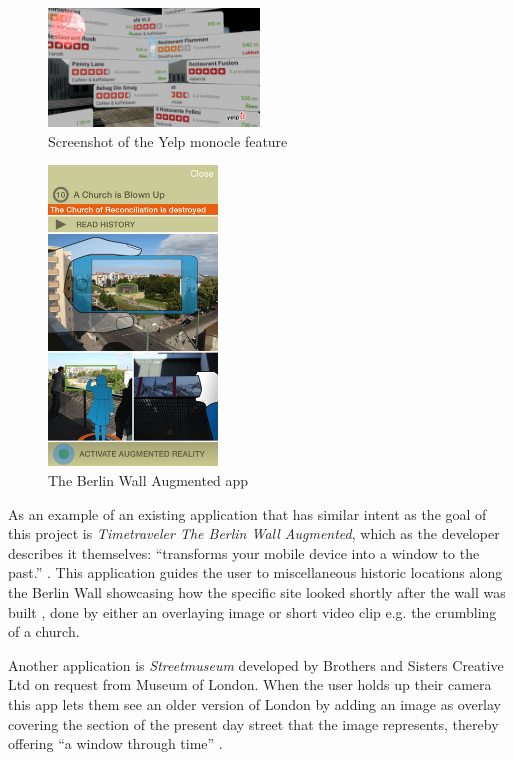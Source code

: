\begin{figure}[h!]
    \centering
    \includegraphics[width=0.5\textwidth]{figures/yelp.png}
    \caption{Screenshot of the Yelp monocle feature}\label{fig:yelp}
\end{figure}

\pagebreak

\begin{figure}
\centering
        \includegraphics[width=0.4\textwidth]{figures/berlinwall.jpeg}
        \caption{The Berlin Wall Augmented app \cite{Hardenberg}}\label{fig:berlin}
\end{figure}

As an example of an existing application that has similar intent as the goal of this project is \textit{Timetraveler The Berlin Wall Augmented}, which as the developer describes it themselves: “transforms your mobile device into a window to the past.” \cite{Hardenberg}. This application guides the user to miscellaneous historic locations along the Berlin Wall showcasing how the specific site looked shortly after the wall was built \cite{Hardenberg}, done by either an overlaying image or short video clip e.g. the crumbling of a church.

Another application is \textit{Streetmuseum} developed by Brothers and Sisters Creative Ltd on request from Museum of London. When the user holds up their camera this app lets them see an older version of London by adding an image as overlay covering the section of the present day street that the image represents, thereby offering “a window through time” \cite{Brothers}.

